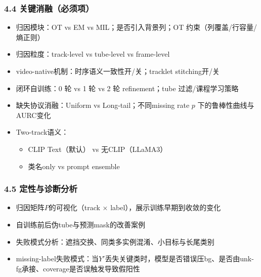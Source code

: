 \documentclass[UTF8]{ctexart}
\begin{document}
\subsubsection*{4.4 关键消融（必须项）}
\begin{itemize}
\item 归因模块：OT vs EM vs MIL；是否引入背景列；OT 约束（列覆盖/行容量/熵正则）
\item 归因粒度：track-level vs tube-level vs frame-level
\item video-native机制：时序语义一致性开/关；tracklet stitching开/关
\item 闭环自训练：0 轮 vs 1 轮 vs 2 轮 refinement；tube 过滤/课程学习策略
\item 缺失协议消融：Uniform vs Long-tail；不同missing rate $p$ 下的鲁棒性曲线与AURC变化
\item Two-track语义：
\begin{itemize}
\begin{itemize}
\item CLIP Text（默认） vs 无CLIP（LLaMA3）
\item 类名only vs prompt ensemble
\end{itemize}
\end{itemize}
\end{itemize}

\subsubsection*{4.5 定性与诊断分析}
\begin{itemize}
\item 归因矩阵$P$的可视化（track × label），展示训练早期到收敛的变化
\item 自训练前后伪tube与预测mask的改善案例
\item 失败模式分析：遮挡交换、同类多实例混淆、小目标与长尾类别
\item missing-label失败模式：当$Y'$丢失关键类时，模型是否错误压bg、是否由unk-fg承接、coverage是否误触发导致假阳性
\end{itemize}

\par\noindent\hrulefill\par
\end{document}
